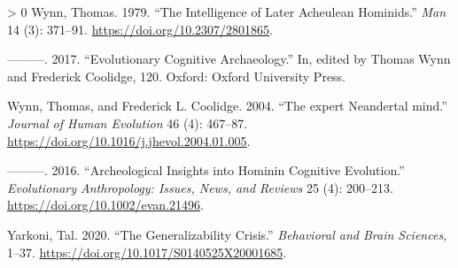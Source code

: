 \documentclass[smallextended]{svjour3}       %
\newlength{\cslhangindent}
\newenvironment{CSLReferences}[3] %
 {%
  \setlength{\parindent}{0pt}
  \ifodd #1 \everypar{\setlength{\hangindent}{\cslhangindent}}\ignorespaces\fi
  \ifnum #2 > 0
  \setlength{\parskip}{#3\baselineskip}
  \fi
 }%
 {}
\begin{document}
\begin{CSLReferences}{1}{0}
\leavevmode\hypertarget{ref-wynn1979}{}%
Wynn, Thomas. 1979. {``The Intelligence of Later Acheulean Hominids.''}
\emph{Man} 14 (3): 371--91. \url{https://doi.org/10.2307/2801865}.

\leavevmode\hypertarget{ref-wynn2017}{}%
---------. 2017. {``Evolutionary Cognitive Archaeology.''} In, edited by
Thomas Wynn and Frederick Coolidge, 120. Oxford: Oxford University
Press.

\leavevmode\hypertarget{ref-wynn2004}{}%
Wynn, Thomas, and Frederick L. Coolidge. 2004. {``The expert Neandertal
mind.''} \emph{Journal of Human Evolution} 46 (4): 467--87.
\url{https://doi.org/10.1016/j.jhevol.2004.01.005}.

\leavevmode\hypertarget{ref-wynn2016}{}%
---------. 2016. {``Archeological Insights into Hominin Cognitive
Evolution.''} \emph{Evolutionary Anthropology: Issues, News, and
Reviews} 25 (4): 200--213. \url{https://doi.org/10.1002/evan.21496}.

\leavevmode\hypertarget{ref-yarkoni2020}{}%
Yarkoni, Tal. 2020. {``The Generalizability Crisis.''} \emph{Behavioral
and Brain Sciences}, 1--37.
\url{https://doi.org/10.1017/S0140525X20001685}.

\end{CSLReferences}



\end{document}
